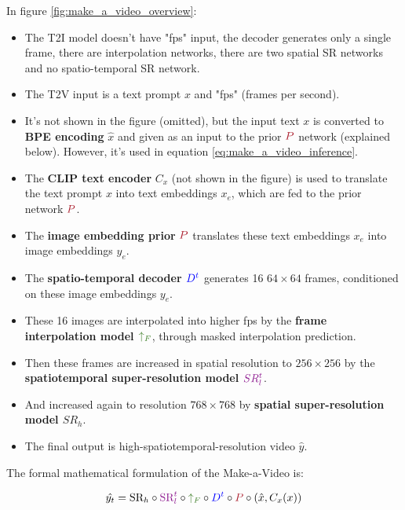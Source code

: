 In figure \ref{fig:make_a_video_overview}:

\begin{itemize}
    \item The T2I model doesn't have "fps" input, the decoder generates only a single frame, there are interpolation networks, there are two spatial SR networks and no spatio-temporal SR network.
    \item The T2V input is a text prompt $x$ and "fps" (frames per second).
    \item It's not shown in the figure (omitted), but the input text $x$ is converted to \textbf{BPE encoding} $\hat{x}$ and given as an input to the prior $\textcolor{Maroon}{P}$ network (explained below). However, it's used in equation \ref{eq:make_a_video_inference}.
    \item The \textbf{CLIP text encoder} $C_x$ (not shown in the figure) is used to translate the text prompt $x$ into text embeddings $x_e$, which are fed to the prior network $\textcolor{Maroon}{P}$.
    \item The \textbf{image embedding prior} $\textcolor{Maroon}{P}$ translates these text embeddings $x_e$ into image embeddings $y_e$.
    \item The \textbf{spatio-temporal decoder $\textcolor{blue}{D^t}$} generates 16 $64\times 64$ frames, conditioned on these image embeddings $y_e$.
    \item These 16 images are interpolated into higher fps by the \textbf{frame interpolation model $\textcolor{OliveGreen}{\uparrow_F}$}, through masked interpolation prediction.
    \item Then these frames are increased in spatial resolution to $256\times 256$ by the \textbf{spatiotemporal super-resolution model $\textcolor{Plum}{SR_l^t}$}.
    \item And increased again to resolution $768\times 768$ by \textbf{spatial super-resolution model $SR_h$}. 
    \item The final output is high-spatiotemporal-resolution video $\hat{y}$.
\end{itemize}

The formal mathematical formulation of the Make-a-Video is:

\begin{equation}
    \hat{y_t} = \text{SR}_h \circ \textcolor{Plum}{\text{SR}_l^t} \circ \textcolor{OliveGreen}{\uparrow_F} \circ \textcolor{blue}{D^t} \circ \textcolor{Maroon}{P} \circ \left( \hat{x}, C_x (x) \right)
    \label{eq:make_a_video_inference}
\end{equation}







